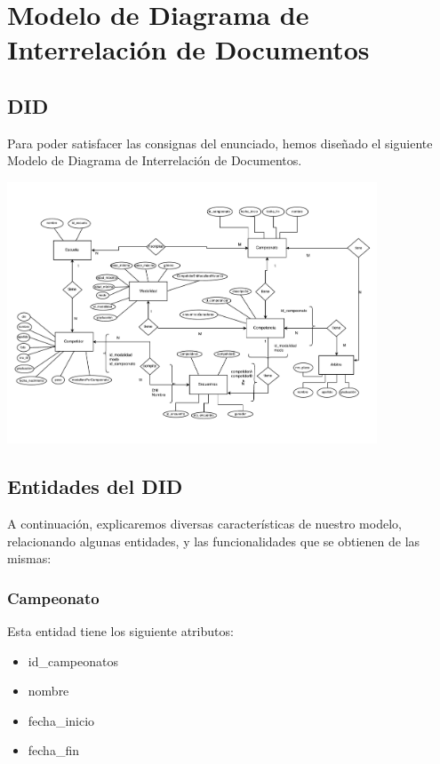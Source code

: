 \section{Modelo de Diagrama de Interrelación de Documentos}

\subsection{DID}
Para poder satisfacer las consignas del enunciado, hemos diseñado el siguiente Modelo de Diagrama de Interrelación de Documentos.

\begin{center}
\includegraphics[width=11cm,keepaspectratio]{./imagenes/DID.pdf}\newline
\end{center}


\subsection{Entidades del DID}
A continuación, explicaremos diversas características de nuestro modelo, relacionando algunas entidades, y las funcionalidades que se obtienen de las mismas:

\subsubsection{Campeonato}

Esta entidad tiene los siguiente atributos:

\begin{itemize}
	\item id_campeonatos
	\item nombre
	\item fecha_inicio
	\item fecha_fin
\end{itemize}

